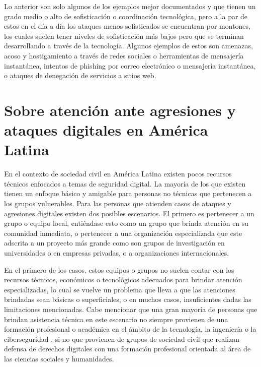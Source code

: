 \documentclass[12pt]{caltech_thesis}
\begin{document}
Lo anterior son solo algunos de los ejemplos mejor documentados y que tienen un grado medio o alto de sofisticación o coordinación tecnológica, pero a la par de estos en el día a día los ataques menos sofisticados se encuentran por montones, los cuales suelen tener niveles de sofisticación más bajos pero que se terminan desarrollando a través de la tecnología. Algunos ejemplos de estos son amenazas, acoso y hostigamiento a través de redes sociales o herramientas de mensajería instantánea, intentos de phishing por correo electrónico o mensajería instantánea, o ataques de denegación de servicios a sitios web.

\section{Sobre atención ante agresiones y ataques digitales en América Latina}

En el contexto de sociedad civil en América Latina  existen pocos recursos técnicos enfocados a temas de seguridad digital. La mayoría de los que existen tienen un enfoque básico y amigable para personas no técnicas que pertenecen a los grupos vulnerables. Para las personas que atienden casos de ataques y agresiones digitales existen dos posibles escenarios. El primero es pertenecer a un grupo o equipo local, entiéndase esto como un grupo que brinda atención en su comunidad inmediata, o pertenecer a una organización especializada que este adscrita a un proyecto más grande como son grupos de investigación en universidades o en empresas privadas, o a organizaciones internacionales.

En el primero de los casos, estos equipos o grupos no suelen contar con los recursos técnicos, económicos o tecnológicos adecuados para brindar atención especializadas, lo cual se vuelve un problema que lleva a que las atenciones brindadas sean básicas o superficiales, o en muchos casos, insuficientes dadas las limitaciones mencionadas. Cabe mencionar que una gran mayoría de personas que brindan asistencia técnica en este escenario no siempre provienen de una formación profesional o académica en el ámbito de la tecnología, la ingeniería o la ciberseguridad , si no que provienen de grupos de sociedad civil que realizan defensa de derechos digitales  con una formación profesional orientada al área de las ciencias sociales y humanidades.
\end{document}
